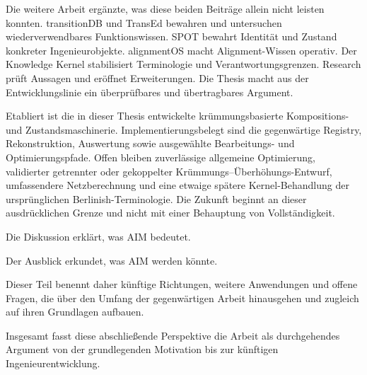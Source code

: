 Die weitere Arbeit ergänzte, was diese beiden Beiträge allein nicht leisten
konnten. transitionDB und TransEd bewahren und untersuchen
wiederverwendbares Funktionswissen. SPOT bewahrt Identität und Zustand
konkreter Ingenieurobjekte. alignmentOS macht Alignment-Wissen operativ. Der
Knowledge Kernel stabilisiert Terminologie und Verantwortungsgrenzen. Research
prüft Aussagen und eröffnet Erweiterungen. Die Thesis macht aus der
Entwicklungslinie ein überprüfbares und übertragbares Argument.

Etabliert ist die in dieser Thesis entwickelte krümmungsbasierte Kompositions-
und Zustandsmaschinerie. Implementierungsbelegt sind die gegenwärtige Registry,
Rekonstruktion, Auswertung sowie ausgewählte Bearbeitungs- und
Optimierungspfade. Offen bleiben zuverlässige allgemeine Optimierung,
validierter getrennter oder gekoppelter Krümmungs--Überhöhungs-Entwurf,
umfassendere Netzberechnung und eine etwaige spätere Kernel-Behandlung der
ursprünglichen Berlinish-Terminologie. Die Zukunft beginnt an dieser
ausdrücklichen Grenze und nicht mit einer Behauptung von Vollständigkeit.

\begin{summary}
Die Diskussion erklärt, was AIM bedeutet.

Der Ausblick erkundet, was AIM werden könnte.

Dieser Teil benennt daher künftige Richtungen, weitere Anwendungen und
offene Fragen, die über den Umfang der gegenwärtigen Arbeit hinausgehen
und zugleich auf ihren Grundlagen aufbauen.
\end{summary}

Insgesamt fasst diese abschließende Perspektive die Arbeit als
durchgehendes Argument von der grundlegenden Motivation bis zur künftigen
Ingenieurentwicklung.
